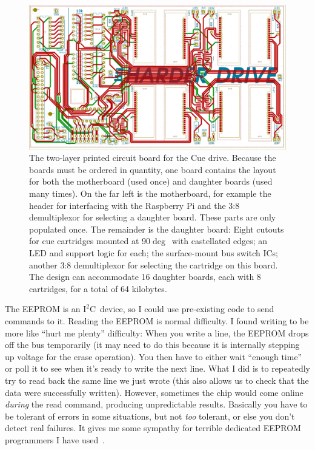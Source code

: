 \documentclass[twocolumn]{article}
\begin{document}
\begin{figure}[ht]
  \centering
  \includegraphics[width=\columnwidth]{pcb}
  \caption{ The two-layer printed circuit board for the Cue drive.
    Because the boards must be ordered in quantity, one board contains
    the layout for both the motherboard (used once) and daughter
    boards (used many times). On the far left is the motherboard, for
    example the header for interfacing with the Raspberry Pi and the
    3:8 demultiplexor for selecting a daughter board. These parts are
    only populated once. The remainder is the daughter board: Eight
    cutouts for cue cartridges mounted at 90$\deg$\ with castellated
    edges; an LED and support logic for each; the surface-mount bus
    switch ICs; another 3:8 demultiplexor for selecting the cartridge
    on this board. The design can accommodate 16 daughter boards, each
    with 8 cartridges, for a total of 64 kilobytes. } \label{fig:pcb}
\end{figure}

\newcommand\itwoc{$\textrm{I}^2\textrm{C}$}

The EEPROM is an \itwoc\ device, so I could use pre-existing code to
send commands to it. Reading the EEPROM is normal difficulty. I found
writing to be more like ``hurt me plenty'' difficulty: When you write
a line, the EEPROM drops off the bus temporarily (it may need to do
this because it is internally stepping up voltage for the erase
operation). You then have to either wait ``enough time'' or poll it to
see when it's ready to write the next line. What I did is to
repeatedly try to read back the same line we just wrote (this also
allows us to check that the data were successfully written). However,
sometimes the chip would come online {\em during} the read command,
producing unpredictable results. Basically you have to be tolerant of
errors in some situations, but not {\em too} tolerant, or else you
don't detect real failures. It gives me some sympathy for terrible
dedicated EEPROM programmers I have used~\cite{murphy2018making}.
\end{document}
